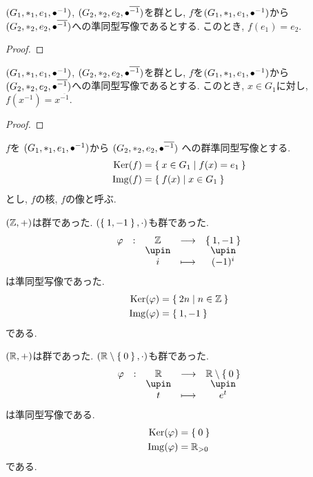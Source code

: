 \begin{prop}
  $(G_1,\ast_1,e_1,{\bullet}^{-1})$,
  $(G_2,\ast_2,e_2,{\bullet}^{\overline{-1}})$を群とし,
  $f$を$(G_1,\ast_1,e_1,{\bullet}^{-1})$から$(G_2,\ast_2,e_2,{\bullet}^{\overline{-1}})$への準同型写像であるとする.
  このとき, $f(e_1)=e_2$.
\end{prop}
\begin{proof}\end{proof}

\begin{prop}
  $(G_1,\ast_1,e_1,{\bullet}^{-1})$,
  $(G_2,\ast_2,e_2,{\bullet}^{\overline{-1}})$を群とし,
  $f$を$(G_1,\ast_1,e_1,{\bullet}^{-1})$から$(G_2,\ast_2,e_2,{\bullet}^{\overline{-1}})$への準同型写像であるとする.
  このとき, $x\in G_1$に対し, $f(x^{-1})=x^{\overline{-1}}$.
\end{prop}
\begin{proof}\end{proof}

\begin{definition}
  $f$を
  $(G_1,\ast_1,e_1,{\bullet}^{-1})$から
  $(G_2,\ast_2,e_2,{\bullet}^{\overline{-1}})$
  への群準同型写像とする.
  \begin{align*}
    \operatorname{Ker}(f)&=\Set{x\in G_1|f(x)=e_1}\\
    \operatorname{Img}(f)&=\Set{f(x)|x\in G_1}
  \end{align*}
  とし, $f$の核, $f$の像と呼ぶ.
\end{definition}
\begin{example}
  $(\mathbb{Z},+)$は群であった.
  $(\Set{1,-1},\cdot)$も群であった.
  \begin{align*}
    \shazo{\varphi}{\ZZ}{\Set{1,-1}}
    {i}{(-1)^i}
  \end{align*}
  は準同型写像であった.
  \begin{align*}
    \operatorname{Ker}(\varphi)&=\Set{2n|n\in \mathbb{Z}}\\ 
    \operatorname{Img}(\varphi)&=\Set{1,-1}
  \end{align*}
  である.
\end{example}
\begin{example}
  $(\mathbb{R},+)$は群であった.
  $(\mathbb{R}\setminus\Set{0},\cdot)$も群であった.
  \begin{align*}
    \shazo{\varphi}{\RR}{\RR\setminus\Set{0}}
    {t}{e^t}
  \end{align*}
  は準同型写像である.
  \begin{align*}
    \operatorname{Ker}(\varphi)&=\Set{0}\\ 
    \operatorname{Img}(\varphi)&=\mathbb{R}_{>0}
  \end{align*}
  である.
\end{example}



